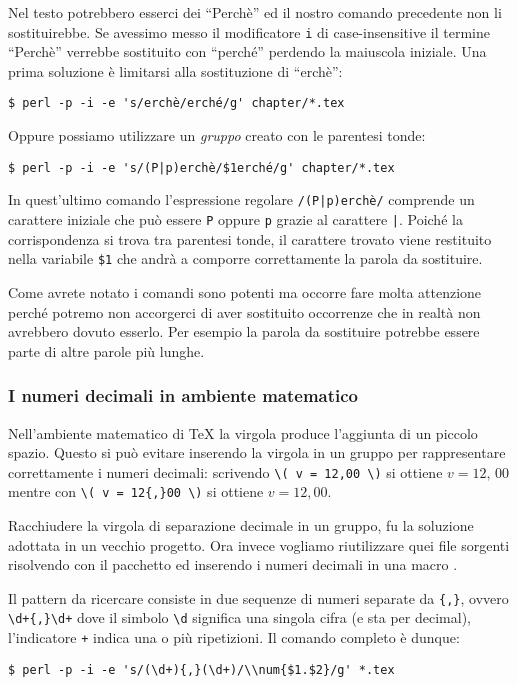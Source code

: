 Nel testo potrebbero esserci dei ``Perchè'' ed il nostro comando precedente non
li sostituirebbe. Se avessimo messo il modificatore \texttt{i} di
case-insensitive il termine ``Perchè'' verrebbe sostituito con ``perché''
perdendo la maiuscola iniziale.
Una prima soluzione è limitarsi alla sostituzione di ``erchè'':
\begin{verbatim}
$ perl -p -i -e 's/erchè/erché/g' chapter/*.tex
\end{verbatim}

Oppure possiamo utilizzare un \emph{gruppo} creato con le parentesi tonde:
\begin{verbatim}
$ perl -p -i -e 's/(P|p)erchè/$1erché/g' chapter/*.tex
\end{verbatim}

In quest'ultimo comando l'espressione regolare \texttt{/(P|p)erchè/} comprende
un carattere iniziale che può essere \texttt{P} oppure \texttt{p} grazie al
carattere \texttt{|}. Poiché la corrispondenza si trova tra parentesi tonde, il
carattere trovato viene restituito nella variabile \texttt{\$1} che andrà a
comporre correttamente la parola da sostituire.

Come avrete notato i comandi sono potenti ma occorre fare molta attenzione
perché potremo non accorgerci di aver sostituito occorrenze che in realtà non
avrebbero dovuto esserlo. Per esempio la parola da sostituire potrebbe essere
parte di altre parole più lunghe.

\subsubsection{I numeri decimali in ambiente matematico}

Nell'ambiente matematico di \TeX{} la virgola produce l'aggiunta di un piccolo
spazio. Questo si può evitare inserendo la virgola in un gruppo per
rappresentare correttamente i numeri decimali: scrivendo \verb!\( v = 12,00 \)!
si ottiene \( v = 12,\, 00 \) mentre con \verb!\( v = 12{,}00 \)! si ottiene \(
v = 12,00 \).

Racchiudere la virgola di separazione decimale in un gruppo, fu la soluzione
adottata in un vecchio progetto. Ora invece vogliamo riutilizzare quei file
sorgenti risolvendo con il pacchetto  ed inserendo i numeri
decimali in una macro .

Il pattern da ricercare consiste in due sequenze di numeri separate da
\texttt{\{,\}}, ovvero \verb=\d+{,}\d+= dove il simbolo \verb=\d= significa una
singola cifra (e sta per decimal), l'indicatore \texttt{+} indica una o più
ripetizioni. Il comando completo è dunque:
\begin{verbatim}
$ perl -p -i -e 's/(\d+){,}(\d+)/\\num{$1.$2}/g' *.tex
\end{verbatim}



